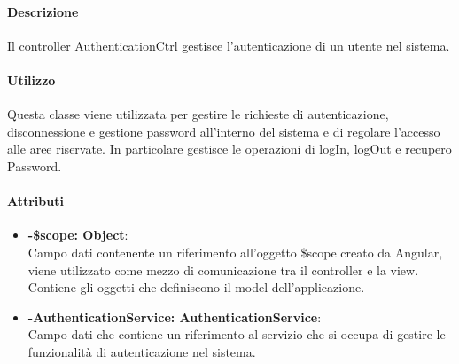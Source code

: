 \paragraph{Descrizione}
	Il controller AuthenticationCtrl gestisce l'autenticazione di un utente nel sistema.
	
	\paragraph{Utilizzo}
	Questa classe viene utilizzata per gestire le richieste di autenticazione, disconnessione e gestione password all'interno del sistema e di regolare l'accesso alle aree riservate.
	In particolare gestisce le operazioni di logIn, logOut e recupero Password.
	\paragraph{Attributi}
	\begin{itemize}
		\item \textbf{-\$scope: Object}:\\
			Campo dati contenente un riferimento all'oggetto \$scope creato da Angular, viene utilizzato come mezzo di comunicazione tra il controller e la view. Contiene gli oggetti che definiscono il model dell'applicazione.
		\item \textbf{-AuthenticationService: AuthenticationService}:\\
			Campo dati che contiene un riferimento al servizio che si occupa di gestire le funzionalità di autenticazione nel sistema.
	\end{itemize}
	
